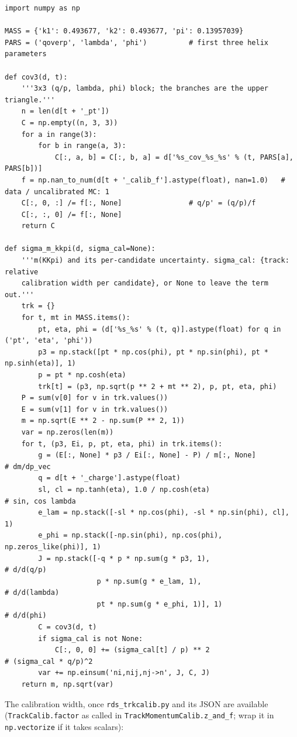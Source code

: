 \documentclass[11pt,a4paper]{article}
\newcommand{\br}[1]{\texttt{#1}}
\begin{document}
\begin{lstlisting}
import numpy as np

MASS = {'k1': 0.493677, 'k2': 0.493677, 'pi': 0.13957039}
PARS = ('qoverp', 'lambda', 'phi')          # first three helix parameters

def cov3(d, t):
    '''3x3 (q/p, lambda, phi) block; the branches are the upper triangle.'''
    n = len(d[t + '_pt'])
    C = np.empty((n, 3, 3))
    for a in range(3):
        for b in range(a, 3):
            C[:, a, b] = C[:, b, a] = d['%s_cov_%s_%s' % (t, PARS[a], PARS[b])]
    f = np.nan_to_num(d[t + '_calib_f'].astype(float), nan=1.0)   # data / uncalibrated MC: 1
    C[:, 0, :] /= f[:, None]                # q/p' = (q/p)/f
    C[:, :, 0] /= f[:, None]
    return C

def sigma_m_kkpi(d, sigma_cal=None):
    '''m(KKpi) and its per-candidate uncertainty. sigma_cal: {track: relative
    calibration width per candidate}, or None to leave the term out.'''
    trk = {}
    for t, mt in MASS.items():
        pt, eta, phi = (d['%s_%s' % (t, q)].astype(float) for q in ('pt', 'eta', 'phi'))
        p3 = np.stack([pt * np.cos(phi), pt * np.sin(phi), pt * np.sinh(eta)], 1)
        p = pt * np.cosh(eta)
        trk[t] = (p3, np.sqrt(p ** 2 + mt ** 2), p, pt, eta, phi)
    P = sum(v[0] for v in trk.values())
    E = sum(v[1] for v in trk.values())
    m = np.sqrt(E ** 2 - np.sum(P ** 2, 1))
    var = np.zeros(len(m))
    for t, (p3, Ei, p, pt, eta, phi) in trk.items():
        g = (E[:, None] * p3 / Ei[:, None] - P) / m[:, None]          # dm/dp_vec
        q = d[t + '_charge'].astype(float)
        sl, cl = np.tanh(eta), 1.0 / np.cosh(eta)                       # sin, cos lambda
        e_lam = np.stack([-sl * np.cos(phi), -sl * np.sin(phi), cl], 1)
        e_phi = np.stack([-np.sin(phi), np.cos(phi), np.zeros_like(phi)], 1)
        J = np.stack([-q * p * np.sum(g * p3, 1),                      # d/d(q/p)
                      p * np.sum(g * e_lam, 1),                         # d/d(lambda)
                      pt * np.sum(g * e_phi, 1)], 1)                    # d/d(phi)
        C = cov3(d, t)
        if sigma_cal is not None:
            C[:, 0, 0] += (sigma_cal[t] / p) ** 2                       # (sigma_cal * q/p)^2
        var += np.einsum('ni,nij,nj->n', J, C, J)
    return m, np.sqrt(var)
\end{lstlisting}

The calibration width, once \br{rds\_trkcalib.py} and its JSON are available (\br{TrackCalib.factor} as
called in \br{TrackMomentumCalib.z\_and\_f}; wrap it in \br{np.vectorize} if it takes scalars):
\end{document}
